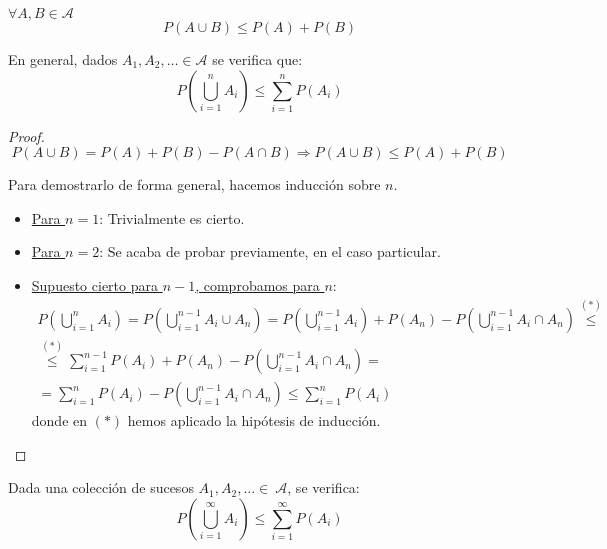 \begin{prop} $\forall A,B \in \mathcal{A}$
  $$P(A \cup B) \leq P(A) + P(B)$$

  En general, dados $A_1, A_2, \ldots \in \mathcal{A}$ se verifica que:
  $$P\left( \bigcup_{i=1}^nA_i \right) \leq \sum_{i=1}^nP(A_i)$$
\end{prop}
\begin{proof}
  $$P(A \cup B) = P(A) + P(B) - P(A \cap B) \Rightarrow P(A \cup B) \leq P(A) + P(B)$$

    Para demostrarlo de forma general, hacemos inducción sobre $n$.
    \begin{itemize}
        \item \underline{Para $n=1$}: Trivialmente es cierto.

        \item \underline{Para $n=2$}: Se acaba de probar previamente, en el caso particular.

        \item \underline{Supuesto cierto para $n-1$, comprobamos para $n$}:
        \begin{multline*}
            P\left( \bigcup_{i=1}^n A_i \right)
            = P\left( \bigcup_{i=1}^{n-1} A_i \cup A_n \right)
            = P\left( \bigcup_{i=1}^{n-1} A_i \right) + P(A_n) -
            P\left( \bigcup_{i=1}^{n-1} A_i \cap A_n \right)
            \stackrel{(\ast)}{\leq} \\ \stackrel{(\ast)}{\leq}
            \sum_{i=1}^{n-1}P(A_i) + P(A_n) - P\left( \bigcup_{i=1}^{n-1} A_i \cap A_n \right)
            =\\=
            \sum_{i=1}^n P(A_i) - P\left( \bigcup_{i=1}^{n-1} A_i \cap A_n \right)
            \leq \sum_{i=1}^n P(A_i)
        \end{multline*}
        donde en $(\ast)$ hemos aplicado la hipótesis de inducción.
    \end{itemize}
\end{proof}

\begin{coro}
    Dada una colección de sucesos $A_1, A_2, \ldots \in~\mathcal{A}$, se verifica: 
    $$P\left( \bigcup_{i=1}^\infty A_i \right) \leq \sum_{i=1}^\infty P(A_i)$$
\end{coro}

